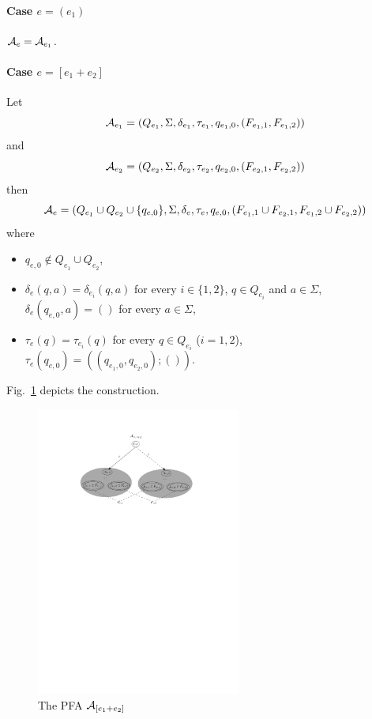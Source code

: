 		
\paragraph{Case $e = (e_1)$} $\mathcal{A}_e = \mathcal{A}_{e_1}$.
		

\paragraph{Case $e = [e_1 + e_2]$} Let 
\[\mathcal{A}_{e_1} = (Q_{e_1}, \Sigma, \delta_{e_1}, \tau_{e_1}, q_{e_1,0}, (F_{e_1,1}, F_{e_1,2}))\] and 
\[\mathcal{A}_{e_2} = (Q_{e_2}, \Sigma, \delta_{e_2}, \tau_{e_2}, q_{e_2,0}, (F_{e_2, 1}, F_{e_2,2}))\] 
then 
\[\mathcal{A}_e = (Q_{e_1} \cup Q_{e_2} \cup \{q_{e,0}\}, \Sigma,
		\delta_e, \tau_e, q_{e,0}, (F_{e_1,1} \cup F_{e_2,1}, F_{e_1,2} \cup F_{e_2,2}))\] where  
		\begin{itemize}
			\item $q_{e,0}  \not \in Q_{e_1} \cup Q_{e_2}$, 
			\item $\delta_e(q, a) = \delta_{e_i}(q, a)$ for every $i \in \{1,2\}$, $q \in Q_{e_i}$ and $a \in \Sigma$, 
			$\delta_e(q_{e,0}, a)  = ()$ for every $a \in \Sigma$, 
			\item $\tau_e(q) = \tau_{e_i}(q)$ for every $q \in Q_{e_i}$ ($i =1,2$), $\tau_e(q_{e,0}) = ((q_{e_1,0},q_{e_2,0}); ())$.
		\end{itemize}
Fig.~\ref{fig-reg2pfa-1} depicts the construction.  	
		\begin{figure}[ht]
			\centering
			\includegraphics[width = 0.6\textwidth]{reg2pfa-1.pdf}
			\caption{The PFA $\mathcal{A}_{[e_1+e_2]}$}
			\label{fig-reg2pfa-1}
		\end{figure}  

